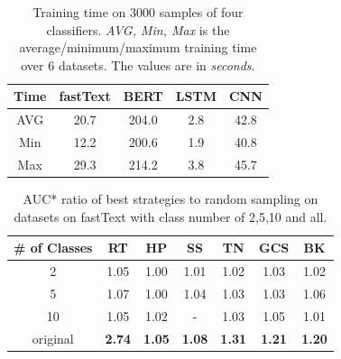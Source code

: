 \begin{table}[th]
	\scriptsize
	\centering
	\begin{tabular}{ccccc}
		\toprule
		Time & fastText & BERT & LSTM & CNN\\ \hline
		AVG & 20.7 & 204.0 & 2.8 & 42.8  \\
		Min & 12.2 & 200.6 & 1.9 & 40.8\\
		Max & 29.3  & 214.2 & 3.8  & 45.7\\
		\bottomrule  
	\end{tabular}
	\caption{Training time on 3000 samples of four classifiers. \emph{AVG, Min, Max} is the average/minimum/maximum training time over 6 datasets. The values are in \emph{seconds}.}
	\label{table:trainingtime}
\end{table}


\begin{table}[!th]
 \scriptsize
 \centering
 \begin{tabular}{ccccccc}
  \toprule
  \# of Classes  & RT & HP & SS & TN & GCS & BK \\ \hline
  2  & 1.05  & 1.00 & 1.01  & 1.02  & 1.03 & 1.02\\
  5   & 1.07 & 1.00  & 1.04 &1.03 & 1.03 & 1.06\\
  10 & 1.05 & 1.02 & -  & 1.03  & 1.05  &  1.01\\
  original  & \textbf{2.74} & \textbf{1.05} & \textbf{1.08} & \textbf{1.31}  & \textbf{1.21}  & \textbf{1.20}\\ 
  
  \bottomrule              
 \end{tabular}
\caption{AUC* ratio of best strategies to random sampling on datasets on fastText with class number of 2,5,10 and all.}
\label{table:ratioOfDataset}
\end{table}


